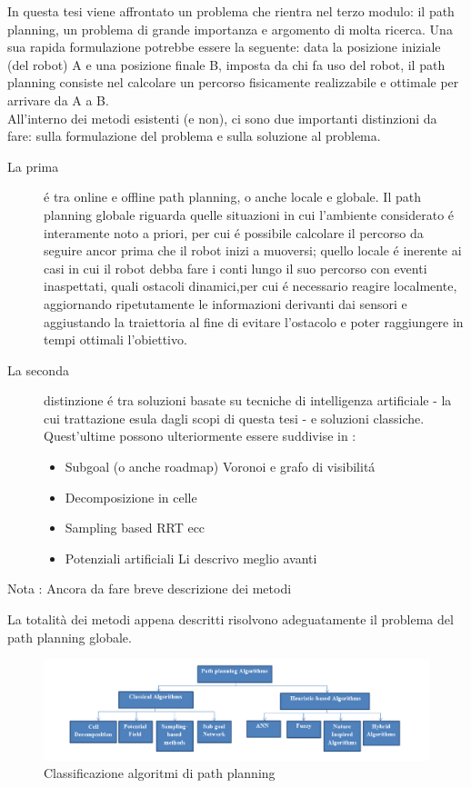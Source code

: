 \documentclass[14pt,twoside,a4paper]{extarticle}
\begin{document}
In questa tesi viene affrontato un problema che rientra nel terzo modulo: il path planning, un problema di grande importanza e argomento di molta ricerca. Una sua rapida formulazione potrebbe essere la seguente: data la posizione iniziale (del robot) A e una posizione finale B, imposta da chi fa uso del robot, il path planning consiste nel calcolare un percorso fisicamente realizzabile e ottimale per arrivare da A a B.\\ 
All'interno dei metodi esistenti (e non), ci sono due importanti distinzioni da fare: sulla formulazione del problema e sulla soluzione al problema.
\begin{description}
\item[La prima] é tra online e offline path planning, o anche locale e globale. Il path planning globale riguarda quelle situazioni in cui l'ambiente considerato é interamente noto a priori, per cui é possibile calcolare il percorso da seguire ancor prima che il robot inizi a muoversi; quello locale é inerente ai casi in cui il robot debba fare i conti lungo il suo percorso con eventi inaspettati, quali ostacoli dinamici,per cui é necessario reagire localmente, aggiornando ripetutamente le informazioni derivanti dai sensori e aggiustando la traiettoria al fine di evitare l'ostacolo e poter raggiungere in tempi ottimali l'obiettivo.
\item[La seconda] distinzione é tra soluzioni basate su tecniche di intelligenza artificiale - la cui trattazione esula dagli scopi di questa tesi - e soluzioni classiche. Quest'ultime possono ulteriormente essere suddivise in :
\begin{itemize}
\item{Subgoal (o anche roadmap)} Voronoi e grafo di visibilitá
\item{Decomposizione in celle}
\item{Sampling based} RRT ecc
\item{Potenziali artificiali} Li descrivo meglio avanti
\end{itemize}
\end{description}

Nota : Ancora da fare breve descrizione dei metodi

La totalità dei metodi appena descritti risolvono adeguatamente il problema del path planning globale.\cite{dalfonso} 

\begin{figure}[H]
\caption{Classificazione algoritmi di path planning\cite{mac2016}}
\includegraphics[width=\textwidth]{algoritmiPP.png}
\end{figure}
\end{document}
